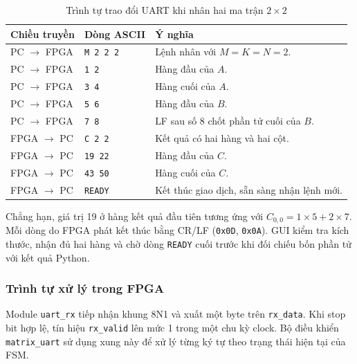 \begin{table}[htbp]
\centering
\caption{Trình tự trao đổi UART khi nhân hai ma trận $2\times2$}
\label{tab:uart_example}
\small
\begin{tabularx}{\linewidth}{@{}l l X@{}}
\toprule
\textbf{Chiều truyền} & \textbf{Dòng ASCII} & \textbf{Ý nghĩa} \\
\midrule
PC $\to$ FPGA & \texttt{M 2 2 2} & Lệnh nhân với $M=K=N=2$. \\
PC $\to$ FPGA & \texttt{1 2}     & Hàng đầu của $A$. \\
PC $\to$ FPGA & \texttt{3 4}     & Hàng cuối của $A$. \\
PC $\to$ FPGA & \texttt{5 6}     & Hàng đầu của $B$. \\
PC $\to$ FPGA & \texttt{7 8}     & LF sau số 8 chốt phần tử cuối của $B$. \\
\midrule
FPGA $\to$ PC & \texttt{C 2 2}   & Kết quả có hai hàng và hai cột. \\
FPGA $\to$ PC & \texttt{19 22}   & Hàng đầu của $C$. \\
FPGA $\to$ PC & \texttt{43 50}   & Hàng cuối của $C$. \\
FPGA $\to$ PC & \texttt{READY}   & Kết thúc giao dịch, sẵn sàng nhận lệnh mới. \\
\bottomrule
\end{tabularx}
\end{table}

Chẳng hạn, giá trị 19 ở hàng kết quả đầu tiên tương ứng với
$C_{0,0}=1\times5+2\times7$. Mỗi dòng do FPGA phát kết thúc bằng
CR/LF (\texttt{0x0D}, \texttt{0x0A}). GUI kiểm tra kích thước,
nhận đủ hai hàng và chờ dòng \texttt{READY} cuối trước khi đối
chiếu bốn phần tử với kết quả Python.

\subsubsection{Trình tự xử lý trong FPGA}

Module \texttt{uart\_rx} tiếp nhận khung 8N1 và xuất một byte trên
\texttt{rx\_data}. Khi stop bit hợp lệ, tín hiệu \texttt{rx\_valid}
lên mức 1 trong một chu kỳ clock. Bộ điều khiển
\texttt{matrix\_uart} sử dụng xung này để xử lý từng ký tự theo
trạng thái hiện tại của FSM.

